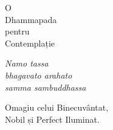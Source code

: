 
\cleartorecto
\thispagestyle{empty}

{\centering

\vspace*{10mm}

\chapterTitleFont\LARGE

O\\
Dhammapada\\
pentru\\
Contemplație

\vspace*{10mm}

\normalsize

\emph{Namo tassa}\\
\emph{bhagavato arahato}\\
\emph{samma sambuddhassa}

\bigskip

Omagiu celui Binecuvântat,\\
Nobil și Perfect Iluminat.

}
